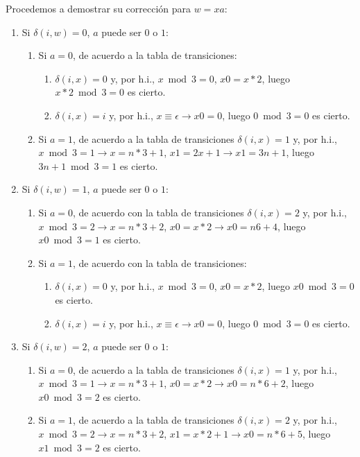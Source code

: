 \documentclass[a4paper]{article}
\begin{document}
  		Procedemos a demostrar su corrección para $w=xa$:
  		\begin{enumerate}
  		\item Si $\delta(i, w) = 0$, $a$ puede ser $0$ o $1$:
  			\begin{enumerate}
  			\item Si $a=0$, de acuerdo a la tabla de transiciones:
  				\begin{enumerate}
  				\item $\delta(i, x) = 0$ y, por h.i., $x\bmod3=0$, $x0 = x*2$, luego $x*2\bmod3=0$ es cierto.
  				\item $\delta(i, x) = i$ y, por h.i., $x\equiv\epsilon \rightarrow x0 = 0$, luego $0\bmod3=0$ es cierto.
  				\end{enumerate}
  			\item Si $a=1$, de acuerdo a la tabla de transiciones $\delta(i, x) = 1$ y, por h.i., $x\bmod3=1 \rightarrow x=n*3+1$, $x1=2x+1 \rightarrow x1=3n+1$, luego $3n+1\bmod3=1$ es cierto.
  			\end{enumerate}
  		\item Si $\delta(i, w) = 1$, $a$ puede ser $0$ o $1$:
  			\begin{enumerate}
  			\item Si $a=0$, de acuerdo con la tabla de transiciones $\delta(i, x) = 2$ y, por h.i., $x\bmod3=2 \rightarrow x=n*3+2$, $x0=x*2 \rightarrow x0=n6+4$, luego $x0\bmod3=1$ es cierto.
  			\item Si $a=1$, de acuerdo con la tabla de transiciones:
  				\begin{enumerate}
  				\item $\delta(i, x) = 0$ y, por h.i., $x\bmod3=0$, $x0 = x*2$, luego $x0\bmod3=0$ es cierto.
  				\item $\delta(i, x) = i$ y, por h.i., $x\equiv\epsilon \rightarrow x0 = 0$, luego $0\bmod3=0$ es cierto.
  				\end{enumerate}
  			\end{enumerate}
  		\item Si $\delta(i, w) = 2$, $a$ puede ser $0$ o $1$:
  			\begin{enumerate}
  			\item Si $a=0$, de acuerdo a la tabla de transiciones $\delta(i, x) = 1$ y, por h.i., $x\bmod3=1 \rightarrow x=n*3+1$, $x0=x*2 \rightarrow x0=n*6+2$, luego $x0\bmod3=2$ es cierto.
  			\item Si $a=1$, de acuerdo a la tabla de transiciones $\delta(i, x) = 2$ y, por h.i., $x\bmod3=2 \rightarrow x=n*3+2$, $x1=x*2+1 \rightarrow x0=n*6+5$, luego $x1\bmod3=2$ es cierto.
  			\end{enumerate}
  		\end{enumerate}
\end{document}
